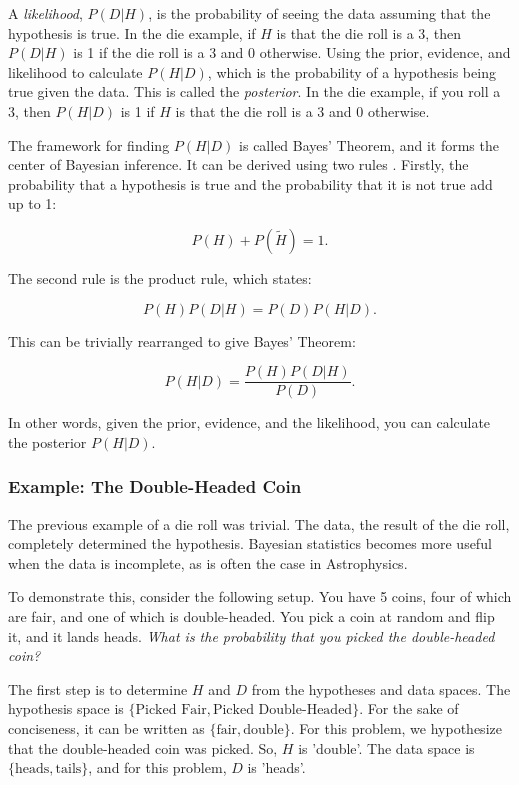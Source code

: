 \documentclass[preprint,longauthor]{aastex631}
\begin{document}
A \textit{likelihood}, $P(D|H)$, is the probability of seeing the data assuming that the hypothesis is true. In the die example, if $H$ is that the die roll is a 3, then $P(D|H)$ is 1 if the die roll is a 3 and 0 otherwise. Using the prior, evidence, and likelihood to calculate $P(H|D)$, which is the probability of a hypothesis being true given the data. This is called the \textit{posterior}. In the die example, if you roll a 3, then $P(H|D)$ is 1 if $H$ is that the die roll is a 3 and 0 otherwise.

The framework for finding $P(H|D)$ is called Bayes' Theorem, and it forms the center of Bayesian inference. It can be derived using two rules \citep{coxProbabilityFrequencyReasonable1946}. Firstly, the probability that a hypothesis is true and the probability that it is not true add up to 1:

\begin{equation}
  P(H) + P(\tilde{H}) = 1.
\end{equation}

The second rule is the product rule, which states:

\begin{equation}
  P(H)P(D|H) = P(D)P(H|D).
\end{equation}

This can be trivially rearranged to give Bayes' Theorem:

\begin{equation}
  P(H|D) = \frac{P(H)P(D|H)}{P(D)}.
\end{equation}

In other words, given the prior, evidence, and the likelihood, you can calculate the posterior $P(H|D)$.

\subsubsection{Example: The Double-Headed Coin}
The previous example of a die roll was trivial. The data, the result of the die roll, completely determined the hypothesis. Bayesian statistics becomes more useful when the data is incomplete, as is often the case in Astrophysics.

To demonstrate this, consider the following setup. You have 5 coins, four of which are fair, and one of which is double-headed. You pick a coin at random and flip it, and it lands heads. \textit{What is the probability that you picked the double-headed coin?}

The first step is to determine $H$ and $D$ from the hypotheses and data spaces. The hypothesis space is $\{\text{Picked Fair},\text{Picked Double-Headed}\}$. For the sake of conciseness, it can be written as $\{\text{fair},\text{double}\}$. For this problem, we hypothesize that the double-headed coin was picked. So, $H$ is 'double'. The data space is $\{\text{heads},\text{tails}\}$, and for this problem, $D$ is 'heads'.
\end{document}
